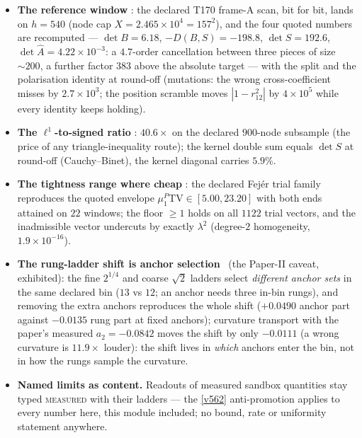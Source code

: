 \documentclass[11pt,a4paper]{article}
\begin{document}
\begin{itemize}[leftmargin=1.5em]
\item \textbf{The reference window} \mE: the declared T170 frame-A scan, bit for
bit, lands on $h=540$ (node cap $X=2.465\times10^{4}=157^{2}$), and the four quoted
numbers are recomputed --- $\det B=6.18$, $-D(B,S)=-198.8$, $\det S=192.6$,
$\det\hat A=4.22\times10^{-3}$: a $4.7$-order cancellation between three pieces of
size ${\sim}200$, a further factor $383$ above the absolute target --- with the
split and the polarisation identity at round-off (mutations: the wrong
cross-coefficient misses by $2.7\times10^{3}$; the position scramble moves
$|1-r_{12}^{2}|$ by $4\times10^{5}$ while every identity keeps holding).
\item \textbf{The $\ell^{1}$-to-signed ratio} \mE: $40.6\times$ on the declared
$900$-node subsample (the price of any triangle-inequality route); the kernel double
sum equals $\det S$ at round-off (Cauchy--Binet), the kernel diagonal carries
$5.9\%$.
\item \textbf{The tightness range where cheap} \mE: the declared Fej\'er trial
family reproduces the quoted envelope $\mu^{P}_{1}\mathrm{TV}\in[5.00,23.20]$ with
both ends attained on $22$ windows; the floor $\ge1$ holds on all $1122$ trial
vectors, and the inadmissible vector undercuts by exactly $\lambda^{2}$ (degree-$2$
homogeneity, $1.9\times10^{-16}$).
\item \textbf{The rung-ladder shift is anchor selection} \mE\ (the Paper-II caveat,
exhibited): the fine $2^{1/4}$ and coarse $\sqrt2$ ladders select \emph{different
anchor sets} in the same declared bin ($13$ vs $12$; an anchor needs three in-bin
rungs), and removing the extra anchors reproduces the whole shift ($+0.0490$ anchor
part against $-0.0135$ rung part at fixed anchors); curvature transport with the
paper's measured $a_2=-0.0842$ moves the shift by only $-0.0111$ (a wrong curvature
is $11.9\times$ louder): the shift lives in \emph{which} anchors enter the bin, not
in how the rungs sample the curvature.
\item \textbf{Named limits as content.} Readouts of measured sandbox quantities stay
typed \textsc{measured} with their ladders --- the \vref{v562} anti-promotion
applies to every number here, this module included; no bound, rate or uniformity
statement anywhere.
\end{itemize}
\end{document}
